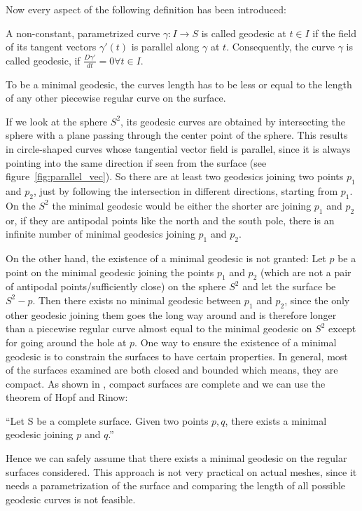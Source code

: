 Now every aspect of the following definition has been introduced:
\begin{mydef}
	A non-constant, parametrized curve $\gamma: I \rightarrow S$ is called geodesic at $t \in I$ if the field of its tangent vectors $\gamma'(t)$ is parallel along $\gamma$ at $t$.
	Consequently, the curve $\gamma$ is called geodesic, if $\frac{D\gamma'}{dt} = 0 \forall t \in I$. \cite[238-246]{do1976differential}
\end{mydef}
To be a minimal geodesic, the curves length has to be less or equal to the length of any other piecewise regular curve on the surface.
\begin{example}
	If we look at the sphere $S^2$, its geodesic curves are obtained by intersecting the sphere with a plane passing through the center point of the sphere.
	This results in circle-shaped curves whose tangential vector field is parallel, since it is always pointing into the same direction if seen from the surface (see figure~\ref{fig:parallel_vec}).
	So there are at least two geodesics joining two points $p_1$ and $p_2$, just by following the intersection in different directions, starting from $p_1$.
	On the $S^2$ the minimal geodesic would be either the shorter arc joining $p_1$ and $p_2$ or, if they are antipodal points like the north and the south pole, there is an infinite number of minimal geodesics joining $p_1$ and $p_2$.
\end{example}
On the other hand, the existence of a minimal geodesic is not granted:
Let $p$ be a point on the minimal geodesic joining the points $p_1$ and $p_2$ (which are not a pair of antipodal points/sufficiently close) on the sphere $S^2$ and let the surface be $S^2-{p}$.
Then there exists no minimal geodesic between $p_1$ and $p_2$, since the only other geodesic joining them goes the long way around and is therefore longer than a piecewise regular curve almost equal to the minimal geodesic on $S^2$ except for going around the hole at $p$.
One way to ensure the existence of a minimal geodesic is to constrain the surfaces to have certain properties.
In general, most of the surfaces examined are both closed and bounded which means, they are compact.
As shown in \cite[331-332]{do1976differential}, compact surfaces are complete and we can use the theorem of Hopf and Rinow: \\
\begin{theorem}
	``Let S be a complete surface. Given two points $p,q$, there exists a minimal geodesic joining $p$ and $q$.'' \cite[333]{do1976differential} \\
\end{theorem}
Hence we can safely assume that there exists a minimal geodesic on the regular surfaces considered.
This approach is not very practical on actual meshes, since it needs a parametrization of the surface and comparing the length of all possible geodesic curves is not feasible.

